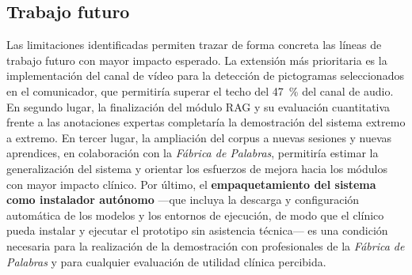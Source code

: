 \subsection{Trabajo futuro}
\label{subsec:trabajo_futuro}

Las limitaciones identificadas permiten trazar de forma concreta las líneas de trabajo
futuro con mayor impacto esperado. La extensión más prioritaria es la implementación
del canal de vídeo para la detección de pictogramas seleccionados en el comunicador,
que permitiría superar el techo del 47~\% del canal de audio. En segundo lugar, la
finalización del módulo \ac{RAG} y su evaluación cuantitativa frente a las anotaciones
expertas completaría la demostración del sistema extremo a extremo. En tercer lugar, la
ampliación del corpus a nuevas sesiones y nuevas aprendices, en colaboración con la
\emph{Fábrica de Palabras}, permitiría estimar la generalización del sistema y
orientar los esfuerzos de mejora hacia los módulos con mayor impacto clínico. Por
último, el \textbf{empaquetamiento del sistema como instalador autónomo} —que incluya
la descarga y configuración automática de los modelos y los entornos de ejecución, de
modo que el clínico pueda instalar y ejecutar el prototipo sin asistencia técnica— es
una condición necesaria para la realización de la demostración con profesionales de la
\emph{Fábrica de Palabras} y para cualquier evaluación de utilidad clínica percibida.


